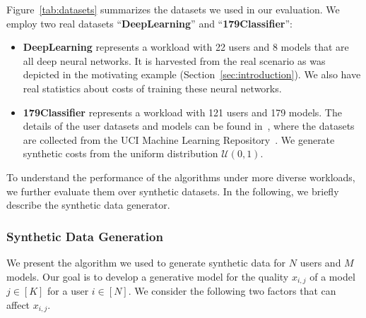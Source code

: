 \documentclass[letterpaper]{vldb}
\begin{document}
Figure~\ref{tab:datasets} summarizes the datasets we used in our evaluation.
We employ two real datasets ``{\bf DeepLearning}'' and ``{\bf 179Classifier}'':
\vspace{-0.5em}
\begin{itemize}
\item {\bf DeepLearning} represents a workload with 22 users and 8 models that are all deep neural networks.
It is harvested from the real scenario as was depicted in the motivating example (Section~\ref{sec:introduction}).
We also have real statistics about costs of training these neural networks.
\vspace{-0.5em}
\item {\bf 179Classifier} represents a workload with 121 users and 179 models. The details of the user datasets and models can be found in~\cite{DelgadoCBA14}, where the datasets are collected from the UCI Machine Learning Repository~\cite{Lichman:2013}. We generate synthetic costs from the uniform distribution $\mathcal{U}(0, 1)$.
\end{itemize}
\vspace{-0.5em}
To understand the performance of the algorithms under more diverse workloads, we further evaluate them over synthetic datasets.
In the following, we briefly describe the synthetic data generator.

\subsubsection{Synthetic Data Generation}\label{sec:experiments:datagen}

We present the algorithm we used to generate synthetic data for $N$ users and $M$ models.
Our goal is to develop a generative model for the quality $x_{i,j}$ of a model $j\in[K]$ for a user $i\in[N]$.
We consider the following two factors that can affect $x_{i,j}$.
\end{document}
